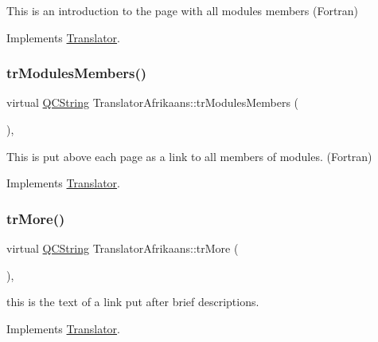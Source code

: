 This is an introduction to the page with all modules members (Fortran) 

Implements \mbox{\hyperlink{class_translator}{Translator}}.

\mbox{\label{class_translator_afrikaans_abf4ff45a189aa2e4722ae835f33cbdb5}} 
\subsubsection{\texorpdfstring{trModulesMembers()}{trModulesMembers()}}
{\footnotesize\ttfamily virtual \mbox{\hyperlink{class_q_c_string}{Q\+C\+String}} Translator\+Afrikaans\+::tr\+Modules\+Members (\begin{DoxyParamCaption}{ }\end{DoxyParamCaption})\hspace{0.3cm}{\ttfamily [inline]}, {\ttfamily [virtual]}}

This is put above each page as a link to all members of modules. (Fortran) 

Implements \mbox{\hyperlink{class_translator}{Translator}}.

\mbox{\label{class_translator_afrikaans_aa5cc4be4fd9b168cce0fcb75694aa4b9}} 
\subsubsection{\texorpdfstring{trMore()}{trMore()}}
{\footnotesize\ttfamily virtual \mbox{\hyperlink{class_q_c_string}{Q\+C\+String}} Translator\+Afrikaans\+::tr\+More (\begin{DoxyParamCaption}{ }\end{DoxyParamCaption})\hspace{0.3cm}{\ttfamily [inline]}, {\ttfamily [virtual]}}

this is the text of a link put after brief descriptions. 

Implements \mbox{\hyperlink{class_translator}{Translator}}.

\mbox{\label{class_translator_afrikaans_a10f8a3227d98d4b33ea72e5f4da1ce85}} 
